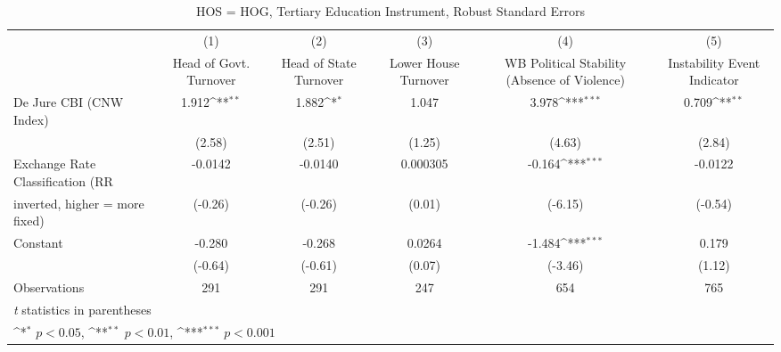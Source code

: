 \begin{table}[htbp]\centering
\def\sym#1{\ifmmode^{#1}\else\(^{#1}\)\fi}
\caption{HOS = HOG, Tertiary Education Instrument, Robust Standard Errors \label{hoshogfivs}}
\begin{tabular}{l*{5}{c}}
\toprule
                                        &\multicolumn{1}{c}{(1)}&\multicolumn{1}{c}{(2)}&\multicolumn{1}{c}{(3)}&\multicolumn{1}{c}{(4)}&\multicolumn{1}{c}{(5)}\\
                                        &\multicolumn{1}{c}{Head of Govt. Turnover}&\multicolumn{1}{c}{Head of State Turnover}&\multicolumn{1}{c}{Lower House Turnover}&\multicolumn{1}{c}{WB Political Stability (Absence of Violence)}&\multicolumn{1}{c}{Instability Event Indicator}\\
\midrule
De Jure CBI (CNW Index)                 &    1.912\sym{**} &    1.882\sym{*}  &    1.047         &    3.978\sym{***}&    0.709\sym{**} \\
                                        &   (2.58)         &   (2.51)         &   (1.25)         &   (4.63)         &   (2.84)         \\
\addlinespace
Exchange Rate Classification (RR        &  -0.0142         &  -0.0140         & 0.000305         &   -0.164\sym{***}&  -0.0122         \\
inverted, higher = more fixed)          &  (-0.26)         &  (-0.26)         &   (0.01)         &  (-6.15)         &  (-0.54)         \\
\addlinespace
Constant                                &   -0.280         &   -0.268         &   0.0264         &   -1.484\sym{***}&    0.179         \\
                                        &  (-0.64)         &  (-0.61)         &   (0.07)         &  (-3.46)         &   (1.12)         \\
\midrule
Observations                            &      291         &      291         &      247         &      654         &      765         \\
\bottomrule
\multicolumn{6}{l}{\footnotesize \textit{t} statistics in parentheses}\\
\multicolumn{6}{l}{\footnotesize \sym{*} \(p<0.05\), \sym{**} \(p<0.01\), \sym{***} \(p<0.001\)}\\
\end{tabular}
\end{table}

